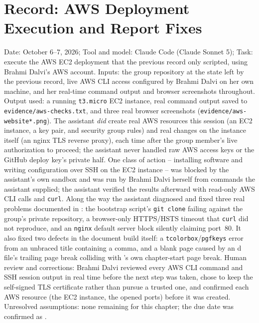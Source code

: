\section{Record: AWS Deployment Execution and Report Fixes}
Date: October 6--7, 2026; Tool and model: Claude Code (Claude Sonnet 5);
Task: execute the AWS EC2 deployment that the previous record only scripted,
using Brahmi Dalvi's AWS account. Inputs: the group repository at the state
left by the previous record, live AWS CLI access configured by Brahmi Dalvi
on her own machine, and her real-time command output and browser screenshots
throughout. Output used: a running \texttt{t3.micro} EC2 instance, real
command output saved to \texttt{evidence/aws-checks.txt}, and three real
browser screenshots (\texttt{evidence/aws-website*.png}). The assistant
\emph{did} create real AWS resources this session (an EC2 instance, a key
pair, and security group rules) and real changes on the instance itself (an
nginx TLS reverse proxy), each time after the group member's live
authorization to proceed; the assistant never handled raw AWS access keys or
the GitHub deploy key's private half. One class of action -- installing
software and writing configuration over SSH on the EC2 instance -- was
blocked by the assistant's own sandbox and was run by Brahmi Dalvi herself
from commands the assistant supplied; the assistant verified the results
afterward with read-only AWS CLI calls and \texttt{curl}. Along the way the
assistant diagnosed and fixed three real problems documented in
: the bootstrap script's \texttt{git clone}
failing against the group's private repository, a browser-only HTTPS/HSTS
timeout that \texttt{curl} did not reproduce, and an \texttt{nginx} default
server block silently claiming port~80. It also fixed two defects in the
document build itself: a \texttt{tcolorbox}/\texttt{pgfkeys} error from an
unbraced title containing a comma, and a blank page caused by an
\texttt{\string}d file's trailing page break colliding with
\texttt{\string\printglossaries}'s own chapter-start page break. Human
review and corrections: Brahmi Dalvi reviewed every AWS CLI command and SSH
session output in real time before the next step was taken, chose to keep
the self-signed TLS certificate rather than pursue a trusted one, and
confirmed each AWS resource (the EC2 instance, the opened ports) before it
was created. Unresolved assumptions: none remaining for this chapter; the
due date was confirmed as \DueDate.
